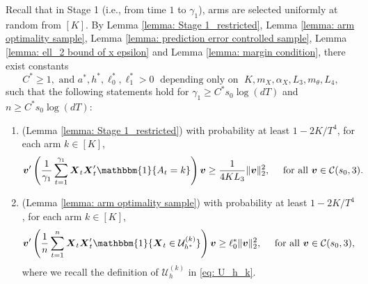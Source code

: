 \documentclass[aos,preprint]{imsart}
\theoremstyle{plain}
\theoremstyle{definition}
\newcommand{\idf}{\mathbbm{1}}
\newcommand{\bX}{\boldsymbol{X}}
\newcommand{\bv}{\boldsymbol{v}}
\begin{document}
\begin{appendix}
Recall that in Stage 1 (i.e., from time $1$ to $\gamma_1$), arms are selected uniformly at random from $[K]$. By  Lemma \ref{lemma: Stage 1_restricted}, Lemma \ref{lemma: arm optimality sample}, Lemma \ref{lemma: prediction error controlled sample},  Lemma \ref{lemma: ell_2 bound of x epsilon} and Lemma \ref{lemma: margin condition}, there exist constants
\begin{equation}
    \label{def:star_constants}
    C^* \geq 1,  \text{ and } a^*, h^*, \ell_0^*, \ell_1^* > 0 \;\text{ depending only on }\;  K,  m_X, \alpha_X,  L_3, m_{\theta}, L_4,
\end{equation}
such that the following statements hold for $\gamma_1 \geq C^*s_0\log(dT)$ and $n \geq C^* s_0\log(dT)$:
\begin{enumerate}
    \item (Lemma \ref{lemma: Stage 1_restricted}) with probability  at least $1-2K/T^4$, for each arm $k \in [K]$, 
    \begin{align}\label{stage 2:aux_eq1}
    \bv'\left(\frac{1}{\gamma_1}\sum_{t=1}^{\gamma_1} \bX_t\bX_t'  \idf\{A_t = k\}\right) \bv \ge \frac{1}{4KL_3}\|\bv\|_2^2,\quad \text{ for all } 
\bv\in \mathcal{C}(s_0,3). 
\end{align} 
    \item (Lemma \ref{lemma: arm optimality sample}) with probability at least $1-2K/T^4$,  for each arm $k \in [K]$, 
    \begin{equation}\label{stage 2:aux_eq2}
\bv'\left(\frac{1}{n}\sum_{t=1}^{n} \bX_t\bX_t'\idf\{\bX_t\in \mathcal{U}_{h^*}^{(k)}\} \right) \bv \ge \ell_0^*\|\bv\|_2^2,\quad \text{ for all } 
\bv\in \mathcal{C}(s_0,3),    
\end{equation}
where we recall the definition of $\mathcal{U}_h^{(k)}$ in \eqref{eq: U_h_k}.


\end{enumerate}
\end{appendix}
\end{document}
